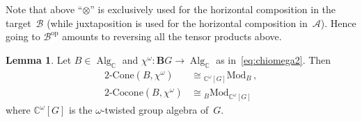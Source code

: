 \documentclass[12pt]{scrartcl}
\newcommand{\boldB}{\boldsymbol{B}}
\newcommand{\B}{\mathcal{B}}
\newcommand{\C}{\mathds{C}}
\newcommand{\Algc}{\operatorname{Alg}_{\C}}
\newcommand{\chiom}{\chi^\omega}
\newcommand{\CGtw}{\C^\omega[G]}
\theoremstyle{definition}
\newtheorem{lemma}[definition]{Lemma}
\numberwithin{equation}{section}
\numberwithin{definition}{section}
\numberwithin{figure}{section}
\begin{document}
Note that above ``$\otimes$'' is exclusively used for the horizontal composition in the target~$\B$ (while juxtaposition is used for the horizontal composition in~$\mathcal A$). 
Hence going to $\B^{\text{op}}$ amounts to reversing all the tensor products above. 

\begin{lemma}
\label{lem:2cone}
Let $B\in \Algc$ and $\chiom \colon \boldB G \to \Algc$ as in~\eqref{eq:chiomega2}. 
Then 
\begin{align}
2\text{-Cone}(B,\chiom) & \cong  {}_{\CGtw}\text{Mod}_B \, , \nonumber 
\\
2\text{-Cocone}(B,\chiom) & \cong  {}_{B}\text{Mod}_{\CGtw}
\end{align}
where $\CGtw$ is the $\omega$-twisted group algebra of~$G$. 
\end{lemma}
\end{document}

